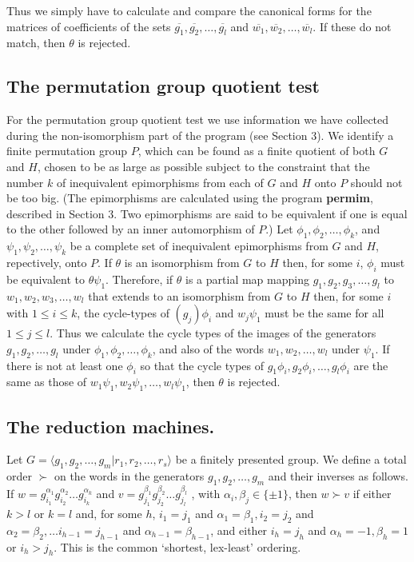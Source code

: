 Thus we 
simply have to calculate and compare the canonical forms for the matrices of
 coefficients of the sets ${\overline{g_1},\overline{g_2},\ldots, 
\overline{g_l}}$ and ${\overline{w_1},\overline{w_2},\ldots, \overline{w_l}}$.
If these do not match, then $\theta$ is rejected.

\subsection{The permutation group quotient test}
For the permutation group quotient test we use information we have collected
during the non-isomorphism part of the program (see Section 3). We identify
a finite permutation group $P$, which can be found as a finite quotient of
both $G$ and $H$, chosen to be as large as possible subject to the
constraint that the number $k$ of 
inequivalent epimorphisms from each of $G$ and $H$ onto $P$ should not be
too big. (The epimorphisms are calculated using the program {\bf permim},
described in Section 3. Two epimorphisms are said to be equivalent
if one is equal to the other followed by an inner automorphism of $P$.)
Let $\phi _1, \phi _2, \ldots, \phi _k$, and $
\psi _1, \psi _2, \ldots , \psi _k$ be a complete set of inequivalent
epimorphisms from $G$ and $H$,
repectively, onto $P$.
If $\theta$ is an
isomorphism from $G$ to $H$ then, for some $i$, $\phi _i$ must be equivalent to
$\theta \psi _1$. Therefore, if $\theta$ is a partial map 
mapping  $g_1, g_2, g_3,\ldots ,g_l$
to $w_1, w_2,w_3,\ldots ,w_l$ that extends to an isomorphism from $G$ to $H$
then, for some $i$ with $1 \leq i \leq k$, the cycle-types of $(g_j)\phi _i$
and $w_j \psi _1$ must be the same for all  $1 \leq j \leq l$.
Thus we calculate the cycle types of the images of the generators $g_1, g_2,
\ldots , g_l$ under $\phi _1, \phi _2, \ldots , \phi _k$, and also of the
words $w_1, w_2, \ldots ,w_l$ under $\psi_1$.
If there is not at least one $\phi _i$ so that the cycle types of
$g_1 \phi _i, g_2 \phi _i, \ldots,  g_l \phi_i $ are the same as those of
$w_1 \psi_1, w_2 \psi_1, \ldots, w_l \psi_1 $, then $\theta$ is rejected.

\subsection{The reduction machines.}
Let $G = \langle g_1, g_2, \ldots , g_m | r_1, r_2, \ldots , r_s \rangle$ 
be a finitely presented group. We define a total order $\succ$ on the words 
in the
generators $g_1, g_2, \ldots , g_m$ and their inverses as follows.
If $w  = g_{i_1}^{\alpha _1}g_{i_2}^{\alpha _2} \dots g_{i_k}^{\alpha_k}$ and
$v = g_{j_1}^{\beta _1}g_{j_2}^{\beta _2} \ldots g_{j_l}^{\beta _l}$ ,
with $\alpha _i , \beta _j \in \{ \pm 1 \}$,
then $w  \succ v $ 
if either $k>l$
or $k=l$ and, for some $h$,
$i_1 = j_1$ and $\alpha _1 = \beta _1, i_2 = j_2$ and $\alpha _2 = \beta _2, \ldots
 i_{h-1} = j_{h-1}$ and $\alpha _{h-1} = \beta _{h-1}$, 
and  either $i_h = j_h$ and $\alpha _h = -1, \beta _h = 1$ or $i_h > j_h$.
This is the common `shortest, lex-least' ordering.

